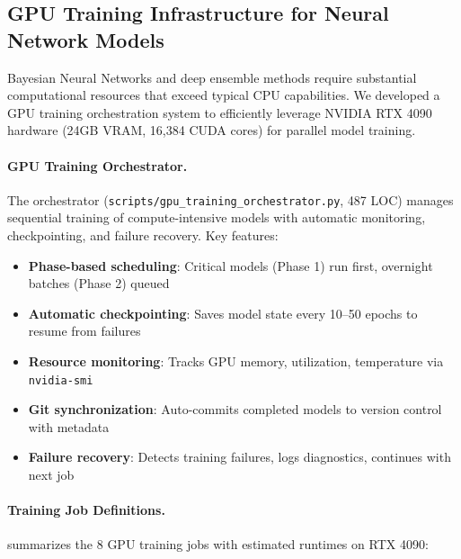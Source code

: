 
\subsection{GPU Training Infrastructure for Neural Network Models}
\label{subsec:gpu-training-infrastructure}

Bayesian Neural Networks and deep ensemble methods require substantial computational resources that exceed typical CPU capabilities. We developed a GPU training orchestration system to efficiently leverage NVIDIA RTX 4090 hardware (24GB VRAM, 16,384 CUDA cores) for parallel model training.

\paragraph{GPU Training Orchestrator.}
The orchestrator (\texttt{scripts/gpu\_training\_orchestrator.py}, 487 LOC) manages sequential training of compute-intensive models with automatic monitoring, checkpointing, and failure recovery. Key features:
\begin{itemize}
  \item \textbf{Phase-based scheduling}: Critical models (Phase 1) run first, overnight batches (Phase 2) queued
  \item \textbf{Automatic checkpointing}: Saves model state every 10--50 epochs to resume from failures
  \item \textbf{Resource monitoring}: Tracks GPU memory, utilization, temperature via \texttt{nvidia-smi}
  \item \textbf{Git synchronization}: Auto-commits completed models to version control with metadata
  \item \textbf{Failure recovery}: Detects training failures, logs diagnostics, continues with next job
\end{itemize}

\paragraph{Training Job Definitions.}
 summarizes the 8 GPU training jobs with estimated runtimes on RTX 4090:


